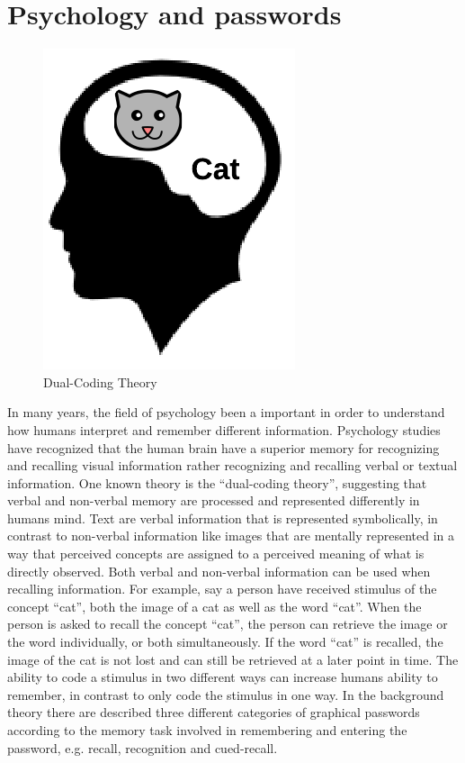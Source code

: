 \section{Psychology and passwords}

  \begin{figure}
    \vspace{-20pt}
    \begin{center}
      \includegraphics[scale=0.35]{pics/dualCoding.png}
    \end{center}
    \vspace{-20pt}
    \caption{Dual-Coding Theory}
    \vspace{-10pt}
  \end{figure}

  In many years, the field of psychology been a important in order to understand how humans interpret and remember different information. Psychology studies have recognized that the human brain have a superior memory for recognizing and recalling visual information rather recognizing and recalling verbal or textual information. One known theory is the ``dual-coding theory'', suggesting that verbal and non-verbal memory are processed and represented differently in humans mind. Text are verbal information that is represented symbolically, in contrast to non-verbal information like images that are mentally represented in a way that perceived concepts are assigned to a perceived meaning of what is directly observed. Both verbal and non-verbal information can be used when recalling information. For example, say a person have received stimulus of the concept ``cat'', both the image of a cat as well as the word ``cat''. When the person is asked to recall the concept ``cat'', the person can retrieve the image or the word individually, or both simultaneously. If the word ``cat'' is recalled, the image of the cat is not lost and can still be retrieved at a later point in time. The ability to code a stimulus in two different ways can increase humans ability to remember, in contrast to only code the stimulus in one way. In the background theory there are described three different categories of graphical passwords according to the memory task involved in remembering and entering the password, e.g. recall, recognition and cued-recall. 

